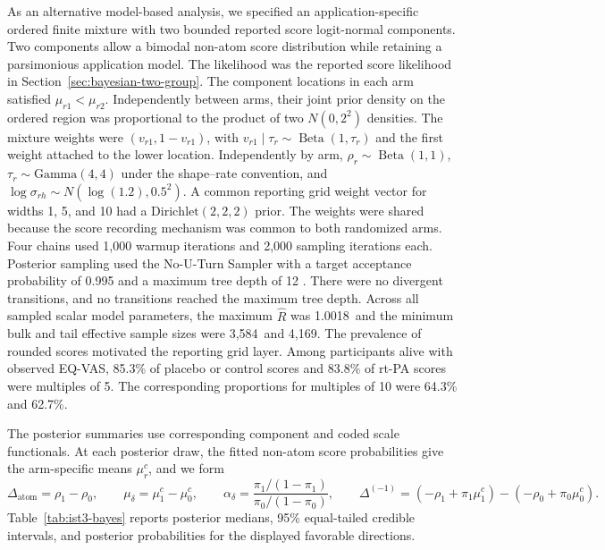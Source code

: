 \documentclass[11pt]{article}
\DeclareMathOperator{\Beta}{Beta}
\newcommand{\ApplicationBayesMaxRhat}{1.0018}
\newcommand{\ApplicationBayesMinBulkEss}{3,584}
\newcommand{\ApplicationBayesMinTailEss}{4,169}
\begin{document}
As an alternative model-based analysis, we specified an application-specific ordered finite mixture with two bounded reported score logit-normal components. Two components allow a bimodal non-atom score distribution while retaining a parsimonious application model. The likelihood was the reported score likelihood in Section~\ref{sec:bayesian-two-group}. The component locations in each arm satisfied $\mu_{r1}<\mu_{r2}$. Independently between arms, their joint prior density on the ordered region was proportional to the product of two $N(0,2^2)$ densities. The mixture weights were $(v_{r1},1-v_{r1})$, with $v_{r1}\mid\tau_r\sim\Beta(1,\tau_r)$ and the first weight attached to the lower location. Independently by arm, $\rho_r\sim\Beta(1,1)$, $\tau_r\sim\mathrm{Gamma}(4,4)$ under the shape--rate convention, and $\log\sigma_{rh}\sim N(\log(1.2),0.5^2)$. A common reporting grid weight vector for widths 1, 5, and 10 had a $\mathrm{Dirichlet}(2,2,2)$ prior. The weights were shared because the score recording mechanism was common to both randomized arms. Four chains used 1{,}000 warmup iterations and 2{,}000 sampling iterations each. Posterior sampling used the No-U-Turn Sampler with a target acceptance probability of 0.995 and a maximum tree depth of 12 \citep{hoffman2014nuts}. There were no divergent transitions, and no transitions reached the maximum tree depth. Across all sampled scalar model parameters, the maximum $\widehat{R}$ was \ApplicationBayesMaxRhat\ and the minimum bulk and tail effective sample sizes were \ApplicationBayesMinBulkEss\ and \ApplicationBayesMinTailEss. The prevalence of rounded scores motivated the reporting grid layer. Among participants alive with observed EQ-VAS, 85.3\% of placebo or control scores and 83.8\% of rt-PA scores were multiples of 5. The corresponding proportions for multiples of 10 were 64.3\% and 62.7\%.

The posterior summaries use corresponding component and coded scale functionals.
At each posterior draw, the fitted non-atom score
probabilities give the arm-specific means $\mu_r^c$, and we form
\[
  \Delta_{\mathrm{atom}}=\rho_1-\rho_0,
  \qquad
  \mu_\delta=\mu_1^c-\mu_0^c,
  \qquad
  \alpha_\delta
  =
  \frac{\pi_1/(1-\pi_1)}{\pi_0/(1-\pi_0)},
  \qquad
  \Delta^{(-1)}
  =
  (-\rho_1+\pi_1\mu_1^c)
  -
  (-\rho_0+\pi_0\mu_0^c).
\]
Table~\ref{tab:ist3-bayes} reports posterior medians, 95\% equal-tailed credible
intervals, and posterior probabilities for the displayed favorable directions.
\end{document}
